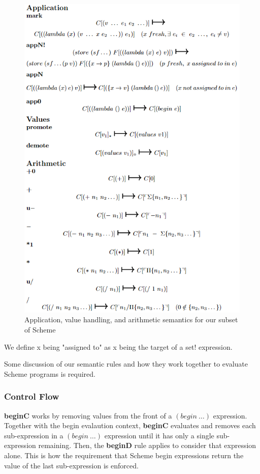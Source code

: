\begin{figure}
\centering
\includegraphics[width=\textwidth,height=\textheight,keepaspectratio]{figures/sem_2.png}
    \caption{Application, value handling, and arithmetic semantics for our subset of Scheme}
    \label{fig:Sem2}
\end{figure}

We define x being "assigned to" as x being the target of a set! expression.

Some discussion of our semantic rules and how they work together to evaluate Scheme programs is required.

\subsubsection{Control Flow}\label{sxn:sem_cf}
\textbf{beginC} works by removing values from the front of a $(begin\ \dots)$ expression. Together with the begin evalaution context, \textbf{beginC} evaluates and removes each sub-expression in a $(begin\ \dots)$ expression until it has only a single sub-expression remaining. Then, the \textbf{beginD} rule applies to consider that expression alone. This is how the requirement that Scheme begin expressions return the value of the last sub-expression is enforced.

